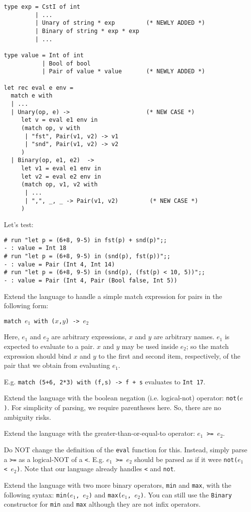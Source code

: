 \documentclass[addpoints]{exam}
\begin{document}
\begin{questions}
\begin{solution}
    \begin{verbatim}
type exp = CstI of int
         | ...
         | Unary of string * exp         (* NEWLY ADDED *)
         | Binary of string * exp * exp
         | ...

type value = Int of int
           | Bool of bool
           | Pair of value * value       (* NEWLY ADDED *)

let rec eval e env =
  match e with
  | ...
  | Unary(op, e) ->                      (* NEW CASE *)
     let v = eval e1 env in
     (match op, v with
      | "fst", Pair(v1, v2) -> v1
      | "snd", Pair(v1, v2) -> v2
     )
  | Binary(op, e1, e2)  ->
     let v1 = eval e1 env in
     let v2 = eval e2 env in
     (match op, v1, v2 with
      | ...
      | ",", _, _ -> Pair(v1, v2)         (* NEW CASE *)
     )
    \end{verbatim}

    
    Let's test:
    \begin{verbatim}
# run "let p = (6+8, 9-5) in fst(p) + snd(p)";;
- : value = Int 18
# run "let p = (6+8, 9-5) in (snd(p), fst(p))";;
- : value = Pair (Int 4, Int 14)
# run "let p = (6+8, 9-5) in (snd(p), (fst(p) < 10, 5))";;
- : value = Pair (Int 4, Pair (Bool false, Int 5))
    \end{verbatim}
  \end{solution}

  
  \question
  Extend the language to handle
  a simple match expression for pairs in the following form:

  \texttt{match $e_1$ with ($x$,$y$) -> $e_2$}

  Here, $e_1$ and $e_2$ are arbitrary expressions,
  $x$ and $y$ are arbitrary names.
  $e_1$ is expected to evaluate to a pair.
  $x$ and $y$ may be used
  inside $e_2$; so the match expression should bind
  $x$ and $y$ to the first and second item, respectively,
  of the pair that we obtain from evaluating $e_1$.

  E.g. \texttt{match (5+6, 2*3) with (f,s) -> f + s}
  evaluates to \texttt{Int 17}.

  
  \question
  Extend the language with
  the boolean negation (i.e. logical-not) operator: \texttt{not($e$)}.
  For simplicity of parsing, we require parentheses here.
  So, there are no ambiguity risks.

  
  \question
  Extend the language with
  the greater-than-or-equal-to operator: \texttt{$e_1$ >= $e_2$}.

  Do NOT change the definition of the \texttt{eval} function for this.
  Instead, simply parse a \texttt{>=}
  as a logical-NOT of a \texttt{<}.
  E.g. \texttt{$e_1$ >= $e_2$} should be parsed
  as if it were \texttt{not($e_1$ < $e_2$)}.
  Note that our language already handles \texttt{<} and \texttt{not}.


  \question
  Extend the language with two more binary operators, \texttt{min} and \texttt{max},
  with the following syntax: \texttt{min($e_1$, $e_2$)} and \texttt{max($e_1$, $e_2$)}.
  You can still use the \texttt{Binary} constructor for
  \texttt{min} and \texttt{max} although they are not infix operators.


  
\end{questions}
\end{document}
